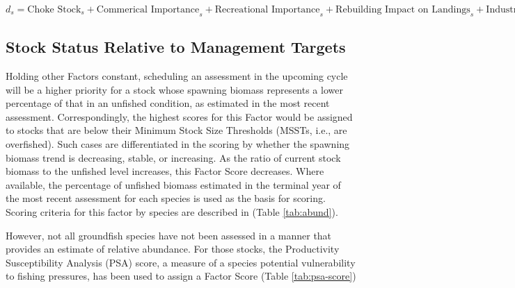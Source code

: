 \documentclass[11pt,
  english,
  a4paper,
]{article}
\begin{document}
\begin{centering}

$d_s = \text{Choke Stock}_s + \text{Commerical Importance}_s + \text{Recreational Importance}_s + \text{Rebuilding Impact on Landings}_s + \text{Industry Concern}_s$

\end{centering}


\hypertarget{stock-status-relative-to-management-targets}{%
\subsection{Stock Status Relative to Management Targets}\label{stock-status-relative-to-management-targets}}

\leavevmode\tagmcend\tagstructend


Holding other Factors constant, scheduling an assessment in the upcoming cycle will be a higher priority for a stock whose spawning biomass represents a lower percentage of that in an unfished condition, as estimated in the most recent assessment. Correspondingly, the highest scores for this Factor would be assigned to stocks that are below their Minimum Stock Size Thresholds (MSSTs, i.e., are overfished). Such cases are differentiated in the scoring by whether the spawning biomass trend is decreasing, stable, or increasing. As the ratio of current stock biomass to the unfished level increases, this Factor Score decreases. Where available, the percentage of unfished biomass estimated in the terminal year of the most recent assessment for each species is used as the basis for scoring. Scoring criteria for this factor by species are described in (Table \ref{tab:abund}).

\leavevmode\tagmcend\tagstructend\par


However, not all groundfish species have not been assessed in a manner that provides an estimate of relative abundance. For those stocks, the Productivity Susceptibility Analysis (PSA) score, a measure of a species potential vulnerability to fishing pressures, has been used to assign a Factor Score (Table \ref{tab:psa-score})

\leavevmode\tagmcend\tagstructend\par
\end{document}
